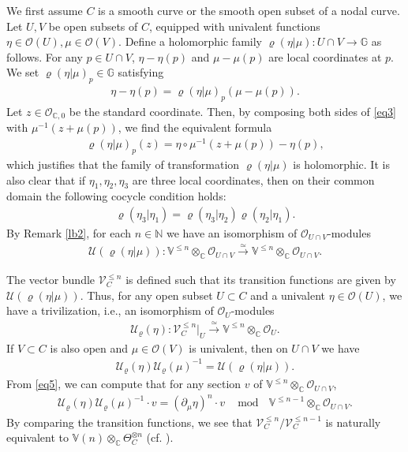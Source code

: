 \documentclass[11pt,b5paper,notitlepage]{article}
\theoremstyle{definition}
\theoremstyle{plain}
\newcommand{\mc}{\mathcal}
\newcommand{\scr}{\mathscr}
\newcommand{\Vbb}{\mathbb V}
\newcommand{\Gbb}{\mathbb G}
\newcommand{\Cbb}{\mathbb C}
\newcommand{\Nbb}{\mathbb N}
\numberwithin{equation}{section}
\begin{document}
We first assume $C$ is a smooth curve or the smooth open subset of a nodal curve. Let $U,V$ be open subsets of $C$, equipped with univalent functions $\eta\in\scr O(U),\mu\in\scr O(V)$.   Define a holomorphic family $\varrho(\eta|\mu):U\cap V\rightarrow\Gbb$  as follows. For any $p\in U\cap V$, $\eta-\eta(p)$ and $\mu-\mu(p)$ are local coordinates at $p$. We set $\varrho(\eta|\mu)_p\in\Gbb$ satisfying
\begin{align}
\eta-\eta(p)=\varrho(\eta|\mu)_p(\mu-\mu(p)).\label{eq3}
\end{align}
Let $z\in\scr O_{\Cbb,0}$ be the standard coordinate. Then, by composing both sides of \eqref{eq3} with $\mu^{-1}(z+\mu(p))$, we find the equivalent formula
\begin{align}
\varrho(\eta|\mu)_p(z)=\eta\circ\mu^{-1}(z+\mu(p))-\eta(p),
\end{align}
which justifies that the family of transformation $\varrho(\eta|\mu)$ is holomorphic. It is also clear that if $\eta_1,\eta_2,\eta_3$ are three local coordinates, then on their common domain the following cocycle condition holds:
\begin{align}
\varrho(\eta_3|\eta_1)=\varrho(\eta_3|\eta_2)\varrho(\eta_2|\eta_1).\label{eq19}
\end{align}
By Remark \ref{lb2}, for each $n\in\Nbb$ we have an isomorphism of $\scr O_{U\cap V}$-modules
\begin{align*}
\mc U(\varrho(\eta|\mu)):\Vbb^{\leq n}\otimes_\Cbb\scr O_{U\cap V}\xrightarrow{\simeq}\Vbb^{\leq n}\otimes_\Cbb\scr O_{U\cap V}.
\end{align*}

The vector bundle $\scr V_C^{\leq n}$ is defined such that its transition functions are given by $\mc U(\varrho(\eta|\mu))$. Thus, for any open subset $U\subset C$ and a univalent $\eta\in\scr O(U)$, we have a trivilization, i.e., an isomorphism of \index{U@$\mc U_\varrho(\eta)$} $\scr O_U$-modules 
\begin{align}\label{eq4}
\mc U_\varrho(\eta):\scr V_C^{\leq n}|_U\xrightarrow{\simeq} \Vbb^{\leq n}\otimes_{\Cbb}\scr O_U.
\end{align}
If $V\subset C$ is also open and  $\mu\in\scr O(V)$ is univalent, then  on $U\cap V$ we have
\begin{align}
\mc U_\varrho(\eta)\mc U_\varrho(\mu)^{-1}=\mc U(\varrho(\eta|\mu)).\label{eq30}
\end{align}
From \eqref{eq5}, we can compute that for any section $v$ of $\Vbb^{\leq n}\otimes_{\Cbb}\scr O_{U\cap V}$,
\begin{align}
\mc U_\varrho(\eta)\mc U_\varrho(\mu)^{-1}\cdot v=(\partial_\mu\eta)^n\cdot v~~\mod ~~\Vbb^{\leq n-1}\otimes_{\Cbb}\scr O_{U\cap V}.\label{eq8}
\end{align}
By comparing the transition functions, we see that $\scr V_C^{\leq n}/\scr V_C^{\leq n-1}$ is naturally equivalent to $\Vbb(n)\otimes_\Cbb\Theta_C^{\otimes n}$ (cf. \cite[Sec. 6.5.9]{FB04}).
\end{document}
